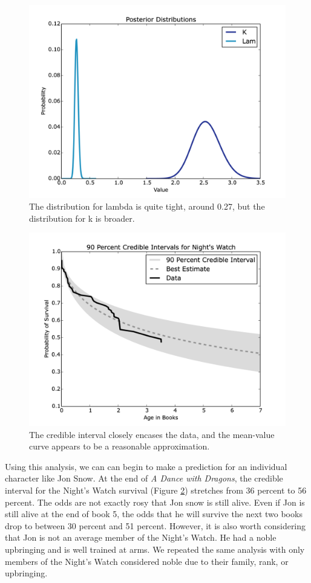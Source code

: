 \documentclass{article}
\begin{document}
\begin{figure}[ht!]
\centering
\includegraphics[width=4.5in]{NWK_lam.png}
\caption{The distribution for lambda is quite tight, around 0.27, but the distribution for k is broader.}
\label{fig:NW_post}
\end{figure}

 \begin{figure}[ht!]
\centering
\includegraphics[width=5in]{NWExp.png}
\caption{The credible interval closely encases the data, and the mean-value curve appears to be a reasonable approximation.}
\label{fig:nwcred}
\end{figure}

\newpage

Using this analysis, we can can begin to make a prediction for an individual character like Jon Snow.  At the end of \textit{A Dance with Dragons}, the credible interval for the Night's Watch survival (Figure \ref{fig:nwcred}) stretches from 36 percent to 56 percent.  The odds are not exactly rosy that Jon snow is still alive.  Even if Jon is still alive at the end of book 5, the odds that he will survive the next two books drop to between 30 percent and 51 percent. However, it is also worth considering that Jon is not an average member of the Night's Watch.  He had a noble upbringing and is well trained at arms. We repeated the same analysis with only members of the Night's Watch considered noble due to their family, rank, or upbringing.
\end{document}
